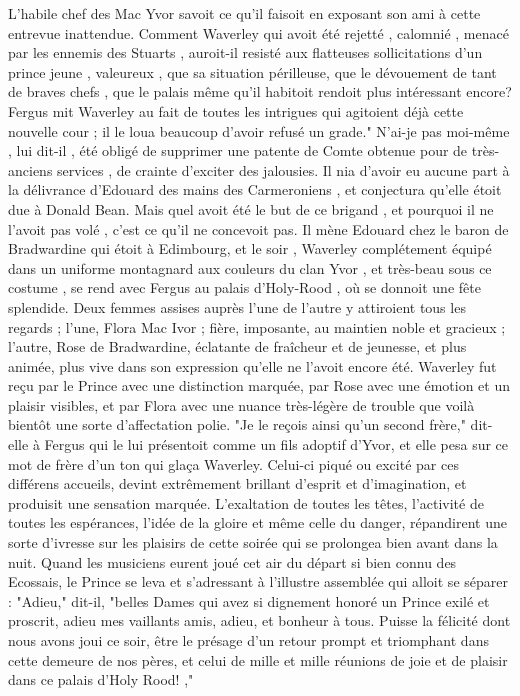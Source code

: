 {L'habile chef des Mac Yvor savoit ce qu'il faisoit en exposant son ami à cette entrevue inattendue. Comment Waverley qui avoit été rejetté , calomnié , menacé par les ennemis des Stuarts , auroit-il resisté aux flatteuses sollicitations d'un prince jeune , valeureux , que sa situation périlleuse, que le dévouement de tant de braves chefs , que le palais même qu'il habitoit rendoit plus intéressant encore? Fergus mit Waverley au fait de toutes les intrigues qui agitoient déjà cette nouvelle cour ; il le loua beaucoup d'avoir refusé un grade." N'ai-je pas moi-même , lui dit-il , été obligé de supprimer une patente de Comte obtenue pour de très-anciens services , de crainte d'exciter des jalousies. Il nia d'avoir eu aucune part à la délivrance d'Edouard des mains des Carmeroniens , et conjectura qu'elle étoit due à Donald Bean. Mais quel avoit été le but de ce brigand , et pourquoi il ne l'avoit pas volé , c'est ce qu'il ne concevoit pas. Il mène Edouard chez le baron de Bradwardine qui étoit à Edimbourg, et le soir , Waverley complétement équipé dans un uniforme montagnard aux couleurs du clan Yvor , et très-beau sous ce costume , se rend avec Fergus au palais d'Holy-Rood , où se donnoit une fête splendide.\setcounter{page}{230} Deux femmes assises auprès l'une de l'autre y attiroient tous les regards ; l'une, Flora Mac Ivor ; fière, imposante, au maintien noble et gracieux ; l'autre, Rose de Bradwardine, éclatante de fraîcheur et de jeunesse, et plus animée, plus vive dans son expression qu'elle ne l'avoit encore été. Waverley fut reçu par le Prince avec une distinction marquée, par Rose avec une émotion et un plaisir visibles, et par Flora avec une nuance très-légère de trouble que voilà bientôt une sorte d'affectation polie. "Je le reçois ainsi qu'un second frère," dit-elle à Fergus qui le lui présentoit comme un fils adoptif d'Yvor, et elle pesa sur ce mot de frère d'un ton qui glaça Waverley. Celui-ci piqué ou excité par ces différens accueils, devint extrêmement brillant d'esprit et d'imagination, et produisit une sensation marquée. L'exaltation de toutes les têtes, l'activité de toutes les espérances, l'idée de la gloire et même celle du danger, répandirent une sorte d'ivresse sur les plaisirs de cette soirée qui se prolongea bien avant dans la nuit. Quand les musiciens eurent joué cet air du départ si bien connu des Ecossais, le Prince se leva et s'adressant à l'illustre assemblée qui alloit se séparer : "Adieu," dit-il, "belles Dames qui avez si dignement honoré un Prince\setcounter{page}{231} exilé et proscrit, adieu mes vaillants amis, adieu, et bonheur à tous. Puisse la félicité dont nous avons joui ce soir, être le présage d'un retour prompt et triomphant dans cette demeure de nos pères, et celui de mille et mille réunions de joie et de plaisir dans ce palais d'Holy Rood! ,"
}
